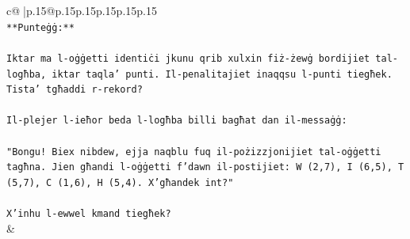 \documentclass{article}
\begin{document}
{\begin{supertabular}{c@{$\;$}|p{.15\linewidth}@{}p{.15\linewidth}p{.15\linewidth}p{.15\linewidth}p{.15\linewidth}p{.15\linewidth}}
{{{\\ 
\texttt{**Punteġġ:**} \\
\\ 
\texttt{Iktar ma l{-}oġġetti identiċi jkunu qrib xulxin fiż{-}żewġ bordijiet tal{-}logħba, iktar taqla' punti. Il{-}penalitajiet inaqqsu l{-}punti tiegħek. Tista' tgħaddi r{-}rekord?} \\
\\ 
\texttt{Il{-}plejer l{-}ieħor beda l{-}logħba billi bagħat dan il{-}messaġġ:} \\
\\ 
\texttt{"Bongu! Biex nibdew, ejja naqblu fuq il{-}pożizzjonijiet tal{-}oġġetti tagħna. Jien għandi l{-}oġġetti f'dawn il{-}postijiet: W (2,7), I (6,5), T (5,7), C (1,6), H (5,4). X'għandek int?"} \\
\\ 
\texttt{X'inhu l{-}ewwel kmand tiegħek?} \\
            }
        }
    }
    & \\ \\


\end{supertabular}}
\end{document}
